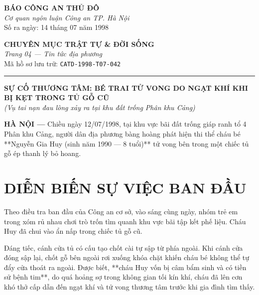 \documentclass[12pt,a4paper]{article}
\begin{document}
\noindent
\begin{minipage}[t]{0.45\textwidth}
    \begin{center}
        \textbf{\large BÁO CÔNG AN THỦ ĐÔ}\\
        \textit{Cơ quan ngôn luận Công an TP. Hà Nội}\\[0.05cm]
        \small Số ra ngày: 14 tháng 07 năm 1998
    \end{center}
\end{minipage}
\hfill
\begin{minipage}[t]{0.52\textwidth}
    \begin{center}
        \small
        \textbf{CHUYÊN MỤC TRẬT TỰ \& ĐỜI SỐNG}\\
        \textit{Trang 04 — Tin tức địa phương}\\[0.05cm]
        Mã hồ sơ lưu trữ: \texttt{CATD-1998-T07-042}
    \end{center}
\end{minipage}

\vspace{0.4cm}
\hrule
\vspace{0.4cm}

\begin{center}
    \textbf{\Large SỰ CỐ THƯƠNG TÂM: BÉ TRAI TỬ VONG DO NGẠT KHÍ KHI BỊ KẸT TRONG TỦ GỖ CŨ}\\
    \textit{(Vụ tai nạn đau lòng xảy ra tại khu đất trống Phân khu Cảng)}
\end{center}

\vspace{0.2cm}

\noindent \textbf{HÀ NỘI —} Chiều ngày 12/07/1998, tại khu vực bãi đất trống giáp ranh tổ 4 Phân khu Cảng, người dân địa phương bàng hoàng phát hiện thi thể cháu bé **Nguyễn Gia Huy (sinh năm 1990 — 8 tuổi)** tử vong bên trong một chiếc tủ gỗ ép thanh lý bỏ hoang.

\section*{DIỄN BIẾN SỰ VIỆC BAN ĐẦU}
Theo điều tra ban đầu của Công an cơ sở, vào sáng cùng ngày, nhóm trẻ em trong xóm rủ nhau chơi trò trốn tìm quanh khu vực bãi tập kết phế liệu. Cháu Huy đã chui vào ẩn nấp trong chiếc tủ gỗ cũ. 

Đáng tiếc, cánh cửa tủ có cấu tạo chốt cài tự sập từ phía ngoài. Khi cánh cửa đóng sập lại, chốt gỗ bên ngoài rơi xuống khóa chặt khiến cháu bé không thể tự đẩy cửa thoát ra ngoài. Được biết, **cháu Huy vốn bị câm bẩm sinh và có tiền sử bệnh tim**, do quá hoảng sợ trong không gian tối kín khí, cháu đã lên cơn khó thở cấp dẫn đến ngạt khí và tử vong thương tâm trước khi gia đình tìm thấy.
\end{document}
